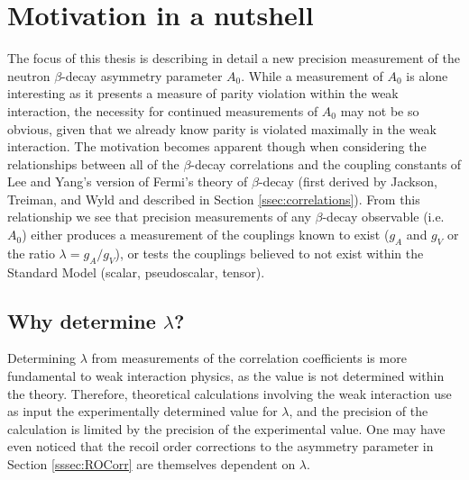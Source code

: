 \section{Motivation in a nutshell}

The focus of this thesis is describing in detail a new precision
measurement of the neutron $\beta$-decay asymmetry parameter $A_0$.
While a measurement of $A_0$ is alone interesting as it presents
a measure of parity
violation within the weak interaction, the necessity for continued measurements of $A_0$
may not be so obvious, given that we already know parity is violated maximally in the
weak interaction. The motivation
becomes apparent though when considering the relationships between all of the
$\beta$-decay correlations and the coupling constants of Lee and Yang's version of Fermi's
theory of $\beta$-decay
(first derived by Jackson, Treiman, and Wyld \cite{jackson1957a} and
described in Section \ref{ssec:correlations}). From this relationship we see that precision
measurements of any $\beta$-decay observable (i.e. $A_0$) either produces a measurement of the couplings
known to exist ($g_A$ and $g_V$ or the ratio $\lambda=g_A/g_V$), or tests the couplings believed to not exist within the
Standard Model (scalar, pseudoscalar, tensor).

\subsection{Why determine $\lambda$?}

Determining $\lambda$ from measurements of the correlation coefficients is more fundamental to
weak interaction physics, as the value is not determined within the theory. Therefore,
theoretical calculations involving the weak interaction use as input the experimentally
determined value for $\lambda$, and the precision of the calculation is limited by the
precision of the experimental value. One may have even noticed that the recoil order corrections to
the asymmetry parameter in
Section \ref{sssec:ROCorr} are themselves dependent on $\lambda$.

